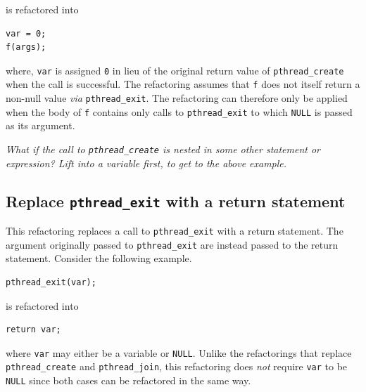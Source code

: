 \documentclass{llncs}
\begin{document}
\noindent
is refactored into

\begin{lstlisting}[frame=single]
var = 0;
f(args);
\end{lstlisting}

\noindent
where, \texttt{var} is assigned \texttt{0} in lieu of the original return value of \lstinline|pthread_create| when the call is successful. The refactoring assumes that \lstinline|f| 
does not itself return a non-null value \emph{via} \lstinline|pthread_exit|. The refactoring can therefore only be applied when the body of \lstinline|f| contains only calls to \lstinline|pthread_exit| to which \lstinline|NULL| is passed as its argument. %

\emph{What if the call to \lstinline|pthread_create| is nested in some other statement or expression? Lift into a variable first, to get to the above example.}

\subsection{Replace \lstinline|pthread_exit| with a return statement}

This refactoring replaces a call to \lstinline|pthread_exit| with a return statement. The argument originally passed to \lstinline|pthread_exit| are instead passed to the return statement. Consider the following example.

\begin{lstlisting}[frame=single]
pthread_exit(var);
\end{lstlisting}

\noindent
is refactored into

\begin{lstlisting}[frame=single]
return var;
\end{lstlisting}

\noindent
where \lstinline|var| may either be a variable or \lstinline|NULL|. Unlike the refactorings that replace \lstinline|pthread_create| and \lstinline|pthread_join|, this refactoring does \emph{not} require \lstinline|var| to be \lstinline|NULL| since both cases can be refactored in the same way.

\end{document}
